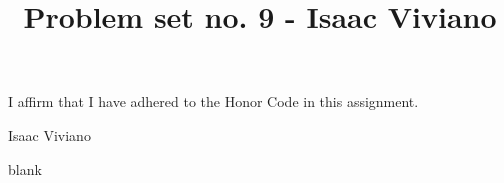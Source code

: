 \documentclass[12pt, reqno]{amsart}
\theoremstyle{definition}
\theoremstyle{remark}
\begin{document}
\title[Math 357 - Harmonic Analysis]{Problem set no. 9 - Isaac Viviano}


\begin{titlepage}
    \maketitle

    I affirm that I have adhered to the Honor Code in this assignment.

    Isaac Viviano
\end{titlepage}

blank
\newpage

\section*{}






\end{document}
